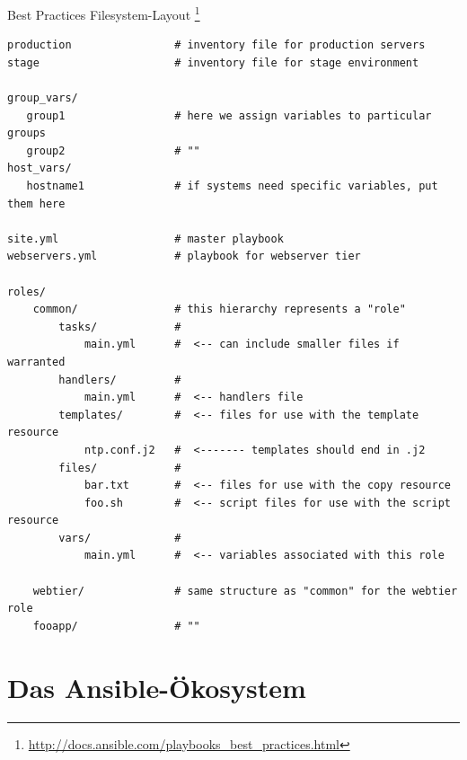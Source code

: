 \begin{frame}[fragile]{Best Practices Filesystem-Layout%
\protect\footnote{\url{http://docs.ansible.com/playbooks_best_practices.html}}}
  \begin{lstlisting}[basicstyle=\tiny\ttfamily]
production                # inventory file for production servers
stage                     # inventory file for stage environment

group_vars/
   group1                 # here we assign variables to particular groups
   group2                 # ""
host_vars/
   hostname1              # if systems need specific variables, put them here

site.yml                  # master playbook
webservers.yml            # playbook for webserver tier

roles/
    common/               # this hierarchy represents a "role"
        tasks/            #
            main.yml      #  <-- can include smaller files if warranted
        handlers/         #
            main.yml      #  <-- handlers file
        templates/        #  <-- files for use with the template resource
            ntp.conf.j2   #  <------- templates should end in .j2
        files/            #
            bar.txt       #  <-- files for use with the copy resource
            foo.sh        #  <-- script files for use with the script resource
        vars/             #
            main.yml      #  <-- variables associated with this role

    webtier/              # same structure as "common" for the webtier role
    fooapp/               # ""
  \end{lstlisting}
\end{frame}


\section{Das Ansible-Ökosystem}

